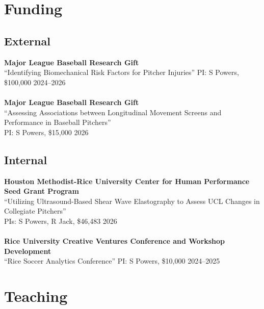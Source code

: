 \documentclass{article}
\begin{document}
\section*{\sc Funding}

\subsection*{\sc External}

{\bf Major League Baseball Research Gift}\\
``Identifying Biomechanical Risk Factors for Pitcher Injuries'' PI: S Powers, \$100,000 \hfill 2024--2026\\
~\\
{\bf Major League Baseball Research Gift}\\
``Assessing Associations between Longitudinal Movement Screens and Performance in Baseball Pitchers''\\
PI: S Powers, \$15,000 \hfill 2026

\subsection*{\sc Internal}

{\bf Houston Methodist-Rice University Center for Human Performance Seed Grant Program}\\
``Utilizing Ultrasound-Based Shear Wave Elastography to Assess UCL Changes in Collegiate Pitchers''\\
PIs: S Powers, R Jack, \$46,483 \hfill 2026\\
~\\
{\bf Rice University Creative Ventures Conference and Workshop Development}\\
``Rice Soccer Analytics Conference'' PI: S Powers, \$10,000 \hfill 2024--2025


\section*{\sc Teaching}
\end{document}
